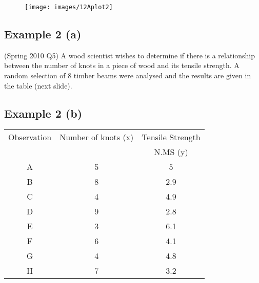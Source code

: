 \documentclass[]{report}
\begin{document}
\begin{figure}
	\texttt{[image: images/12Aplot2]}\\
\end{figure}



\subsection{Example 2 (a)}
(Spring 2010 Q5)\newline
A wood scientist wishes to determine if there is a relationship between the number of knots in a piece of wood and its tensile strength. A random selection of 8 timber beams were analysed and the results are given in the table (next slide).


\subsection{Example 2 (b)}
\begin{center}
	\begin{tabular}{|c|c|c|}
		\hline
		Observation &Number of knots (x) &Tensile Strength \\
		&&N.MS (y)\\ \hline
		A &5&5\\
		B &8&2.9\\
		C &4&4.9\\
		D &9&2.8\\
		E &3&6.1\\
		F &6&4.1\\
		G &4&4.8\\
		H &7&3.2\\
		\hline
	\end{tabular}
\end{center}


\end{document}
